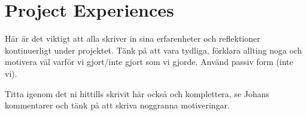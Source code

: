 \documentclass[10pt,a4paper]{article}
\begin{document}
\section*{Project Experiences}
Här är det viktigt att alla skriver in sina erfarenheter och reflektioner kontinuerligt under projektet. Tänk på att vara tydliga, förklara allting noga och motivera väl varför vi gjort/inte gjort som vi gjorde. Använd passiv form (inte vi).

Titta igenom det ni hittills skrivit här också och komplettera, se Johans kommentarer och tänk på att skriva noggranna motiveringar. 
\end{document}
